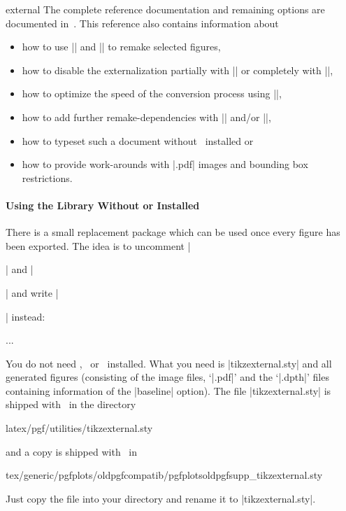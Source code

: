 \begin{pgfplotslibrary}{external}
The complete reference documentation and remaining options are documented in~\cite[``Externalization Library'']{tikz}. This reference also contains information about
\begin{itemize}
	\item how to use || and || to remake selected figures,
	\item how to disable the externalization partially with || or completely with |\tikzexternaldisable|,
	\item how to optimize the speed of the conversion process using |\tikzset{external/optimize command away=\myExpensiveMacro}|,
	\item how to add further remake-dependencies with |\tikzpicturedependsonfile| and/or  |\tikzexternalfiledependsonfile|,
	\item how to typeset such a document without \pgfname\ installed or
	\item how to provide work-arounds with |.pdf| images and bounding box restrictions.
\end{itemize}

\paragraph{Using the Library Without {\normalfont\pgfname} or {\normalfont\PGFPlots} Installed}
There is a small replacement package  which can be used once every figure has been exported. The idea is to uncomment |\usepackage{tikz}| and |\usepackage{pgfplots}| and write |\usepackage{tikzexternal}| instead:
\begin{codeexample}
\usepackage{tikzexternal}
\tikzexternalize%


...

\end{codeexample}
You do not need \pgfname, \tikzname\ or \PGFPlots\ installed. What you need is |tikzexternal.sty| and all generated figures (consisting of the image files, `|.pdf|' and the `|.dpth|' files containing information of the |baseline| option). The file |tikzexternal.sty| is shipped with \pgfname\ in the directory
\begin{codeexample}
latex/pgf/utilities/tikzexternal.sty
\end{codeexample}
and a copy is shipped with \PGFPlots\ in
\begin{codeexample}
tex/generic/pgfplots/oldpgfcompatib/pgfplotsoldpgfsupp_tikzexternal.sty
\end{codeexample}
Just copy the file into your directory and rename it to |tikzexternal.sty|.


\end{pgfplotslibrary}
